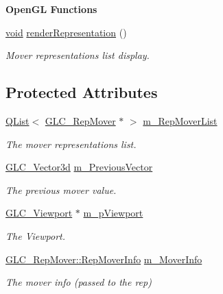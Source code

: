 \begin{Indent}{\bf Open\-G\-L Functions}\par
\begin{DoxyCompactItemize}
\item 
\hyperlink{group___u_a_v_objects_plugin_ga444cf2ff3f0ecbe028adce838d373f5c}{void} \hyperlink{class_g_l_c___mover_ac073b036242e55ac68ffa32547e32dc4}{render\-Representation} ()
\begin{DoxyCompactList}\small\item\em Mover representations list display. \end{DoxyCompactList}\end{DoxyCompactItemize}
\end{Indent}
\subsection*{Protected Attributes}
\begin{DoxyCompactItemize}
\item 
\hyperlink{class_q_list}{Q\-List}$<$ \hyperlink{class_g_l_c___rep_mover}{G\-L\-C\-\_\-\-Rep\-Mover} $\ast$ $>$ \hyperlink{class_g_l_c___mover_a25ce5c9b799eae3464346ac151047c6f}{m\-\_\-\-Rep\-Mover\-List}
\begin{DoxyCompactList}\small\item\em The mover representations list. \end{DoxyCompactList}\item 
\hyperlink{class_g_l_c___vector3d}{G\-L\-C\-\_\-\-Vector3d} \hyperlink{class_g_l_c___mover_a514f83b7922d5e260800215abf4dc47c}{m\-\_\-\-Previous\-Vector}
\begin{DoxyCompactList}\small\item\em The previous mover value. \end{DoxyCompactList}\item 
\hyperlink{class_g_l_c___viewport}{G\-L\-C\-\_\-\-Viewport} $\ast$ \hyperlink{class_g_l_c___mover_a9c48f31500f8968481b33d30e6694c85}{m\-\_\-p\-Viewport}
\begin{DoxyCompactList}\small\item\em The Viewport. \end{DoxyCompactList}\item 
\hyperlink{struct_g_l_c___rep_mover_1_1_rep_mover_info}{G\-L\-C\-\_\-\-Rep\-Mover\-::\-Rep\-Mover\-Info} \hyperlink{class_g_l_c___mover_acb3a70ceabd4bd81662a15502da4f004}{m\-\_\-\-Mover\-Info}
\begin{DoxyCompactList}\small\item\em The mover info (passed to the rep) \end{DoxyCompactList}\end{DoxyCompactItemize}



